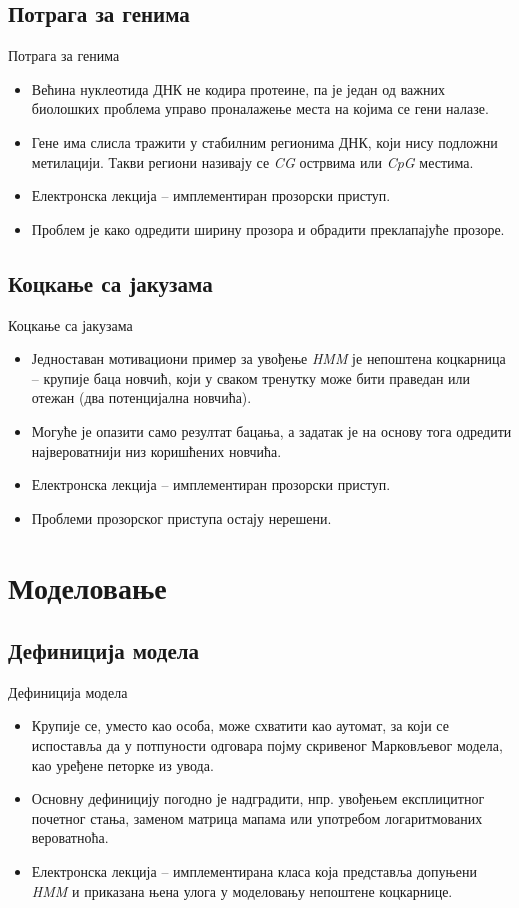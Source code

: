 \documentclass[hyperref={bookmarks=false}]{beamer}
\begin{document}
\subsection{Потрага за генима}
\begin{frame}{Потрага за генима}
\begin{itemize}
\item Већина нуклеотида ДНК не кодира протеине, па је један од важних биолошких проблема управо проналажење места на којима се гени налазе.
\item Гене има слисла тражити у стабилним регионима ДНК, који нису подложни метилацији. Такви региони називају се \textit{CG} острвима или \textit{CpG} местима.
\item Електронска лекција -- имплементиран прозорски приступ.
\item Проблем је како одредити ширину прозора и обрадити преклапајуће прозоре.
\end{itemize}
\end{frame}

\subsection{Коцкање са јакузама}
\begin{frame}{Коцкање са јакузама}
\begin{itemize}
\item Једноставан мотивациони пример за увођење \textit{HMM} је непоштена коцкарница -- крупије баца новчић, који у сваком тренутку може бити праведан или отежан (два потенцијална новчића).
\item Могуће је опазити само резултат бацања, а задатак је на основу тога одредити највероватнији низ коришћених новчића.
\item Електронска лекција -- имплементиран прозорски приступ.
\item Проблеми прозорског приступа остају нерешени.
\end{itemize}
\end{frame}

\section{Моделовање}
\subsection{Дефиниција модела}
\begin{frame}{Дефиниција модела}
\begin{itemize}
\item Крупије се, уместо као особа, може схватити као аутомат, за који се испоставља да у потпуности одговара појму скривеног Марковљевог модела, као уређене петорке из увода.
\item Основну дефиницију погодно је надградити, нпр. увођењем експлицитног почетног стања, заменом матрица мапама или употребом логаритмованих вероватноћа.
\item Електронска лекција -- имплементирана класа која представља допуњени \textit{HMM} и приказана њена улога у моделовању непоштене коцкарнице.
\end{itemize}
\end{frame}
\end{document}
